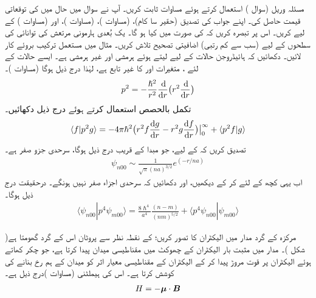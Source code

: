  
مسئلہ وریل (سوال ) استعمال کرتے ہوئے مساوات  ثابت کریں۔ 
آپ نے سوال  میں حال  میں  کی توقعاتی قیمت حاصل کی۔ اپنے جواب کی تصدیق  (حقیر سا کام)،  (مساوات )،  (مساوات )، اور  (مساوات ) کے لیے کریں۔ اس پر تبصرہ کریں کہ  کی صورت میں کیا ہو گا۔
 یک بُعدی ہارمونی مرتعش کی توانائی کی سطحوں کے لیے (سب سے کم رتبی) اضافیتی تصحیح تلاش کریں۔ مثال  میں مستعمل ترکیب بروئے کار لائیں۔ 
دکھائیں کہ ہائیڈروجن حالات کے لیے  لیتے ہوئے  ہرمشی اور  غیر ہرمشی ہے۔ ایسے حالات کے لئے ، متغیرات  اور  کا غیر تابع ہے، لہٰذا درج ذیل ہوگا (مساوات )۔
\begin{align*}
p^2 = - \frac{\hslash^2}{r^2} \frac{\dif }{\dif r} \big ( r^2 \frac{\dif}{\dif r} \big )
\end{align*}
تکمل بالحصص استعمال کرتے ہوئے درج ذیل دکھائیں۔
\begin{align*}
\langle f | p^2 g \rangle = - 4 \pi \hslash^2 
\big ( r^2 f \frac{\dif g}{\dif r} - r^2 g \frac{\dif f}{\dif r} \big ) \big \rvert_0^{\infty} + \langle p^2 f | g \rangle 
\end{align*}
تصدیق کریں کہ  کے لیے، جو مبدا کے قریب درج ذیل ہوگا، سرحدی جزو صفر ہے۔
\begin{align*}
\psi_{n00} \sim \frac{1}{\sqrt{\pi} (na)^{3/2}} e^{(-r/na)}
\end{align*}
اب یہی کچھ  کے لئے کر کے دیکھیں، اور دکھائیں کہ سرحدی اجزاء صفر نہیں ہونگے۔ درحقیقت درج ذیل ہوگا۔
\begin{align*}
\langle \psi_{n00} | p^4 \psi_{m00} \rangle = \frac{8\hslash^4}{a^4} \frac{(n - m)}{(nm)^{5/2}} + \langle p^4 \psi_{n00} | \psi_{m00} \rangle
\end{align*}


مرکزہ کے گرد مدار میں الیکٹران کا تصور کریں؛  کے نقطہ نظر سے پروٹان اس کے گرد گھومتا ہے( شکل )۔ مدار میں مثبت بار الیکٹران کے چھوکٹ میں مقناطیسی میدان  پیدا کرتا ہے، جو چکر کھاتے ہوئے الیکٹران پر قوت مروڑ پیدا کر کے الیکٹران کے مقناطیسی معیار اثر  کو میدان کے ہم رخ بنانے کی کوشش کرتا ہے۔ اس کی ہیملٹنی (مساوات )درج ذیل ہے۔
\begin{align}\label{مساوات_غیر_مضطرب_مقناطیسی_میدان_میں_ہیملٹنی}
H = - {{\boldsymbol{\mu}}} \cdot {\ensuremath{{\boldsymbol{B}}}}
\end{align}

